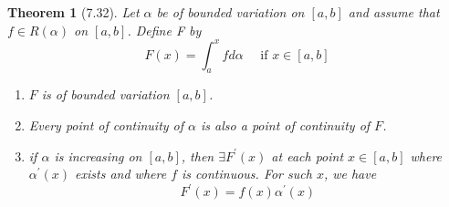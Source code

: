 \documentclass[aps,pra,notitlepage,amsmath,amssymb,letterpaper,12pt]{revtex4-1}
\newtheorem{theorem}{Theorem}
\begin{document}
\begin{theorem}[7.32]
Let $\alpha$ be of bounded variation on $[a,b]$ and assume that
$f \in R(\alpha)$ on $[a,b]$. Define F by
\[F(x)=\int_{a}^{x} f d \alpha \quad \textrm{ if } x \in [a,b]\]
\begin{enumerate}[\upshape a)]
  \item $F$ is of bounded variation $[a,b]$.
  \item Every point of continuity of $\alpha$ is also a point of continuity of $F$.
  \item if $\alpha$ is increasing on $[a,b]$, then $\exists F^\prime(x)$ at each point $x \in [a,b]$ where $\alpha^\prime(x)$ exists and where $f$ is continuous. For such $x$, we have $$F^\prime(x) = f(x)\alpha^\prime(x)$$
\end{enumerate}
\end{theorem}
\end{document}
